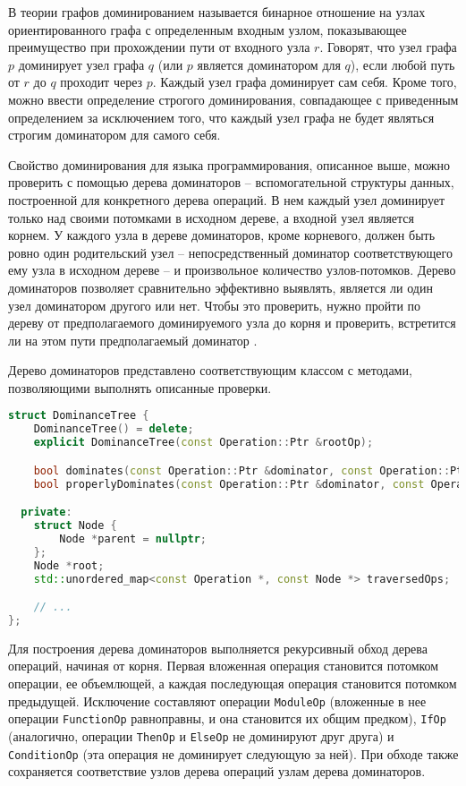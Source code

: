 В теории графов доминированием называется бинарное отношение на узлах ориентированного графа с определенным входным узлом, показывающее преимущество при прохождении пути от входного узла \(r\).
Говорят, что узел графа \(p\) доминирует узел графа \(q\) (или \(p\) является доминатором для \(q\)), если любой путь от \(r\) до \(q\) проходит через \(p\).
Каждый узел графа доминирует сам себя.
Кроме того, можно ввести определение строгого доминирования, совпадающее с приведенным определением за исключением того, что каждый узел графа не будет являться строгим доминатором для самого себя.

Свойство доминирования для языка программирования, описанное выше, можно проверить с помощью дерева доминаторов -- вспомогательной структуры данных, построенной для конкретного дерева операций.
В нем каждый узел доминирует только над своими потомками в исходном дереве, а входной узел является корнем.
У каждого узла в дереве доминаторов, кроме корневого, должен быть ровно один родительский узел -- непосредственный доминатор соответствующего ему узла в исходном дереве -- и произвольное количество узлов-потомков.
Дерево доминаторов позволяет сравнительно эффективно выявлять, является ли один узел доминатором другого или нет.
Чтобы это проверить, нужно пройти по дереву от предполагаемого доминируемого узла до корня и проверить, встретится ли на этом пути предполагаемый доминатор \cite{habr_dominance}.

Дерево доминаторов представлено соответствующим классом с методами, позволяющими выполнять описанные проверки.

\begin{lstlisting}[language=C++, caption=Объявление класса DominanceTree]
struct DominanceTree {
    DominanceTree() = delete;
    explicit DominanceTree(const Operation::Ptr &rootOp);

    bool dominates(const Operation::Ptr &dominator, const Operation::Ptr &dominated) const;
    bool properlyDominates(const Operation::Ptr &dominator, const Operation::Ptr &dominated) const;

  private:
    struct Node {
        Node *parent = nullptr;
    };
    Node *root;
    std::unordered_map<const Operation *, const Node *> traversedOps;

    // ...
};
\end{lstlisting}

Для построения дерева доминаторов выполняется рекурсивный обход дерева операций, начиная от корня.
Первая вложенная операция становится потомком операции, ее объемлющей, а каждая последующая операция становится потомком предыдущей.
Исключение составляют операции \verb|ModuleOp| (вложенные в нее операции \verb|FunctionOp| равноправны, и она становится их общим предком), \verb|IfOp| (аналогично, операции \verb|ThenOp| и \verb|ElseOp| не доминируют друг друга) и \verb|ConditionOp| (эта операция не доминирует следующую за ней).
При обходе также сохраняется соответствие узлов дерева операций узлам дерева доминаторов.


